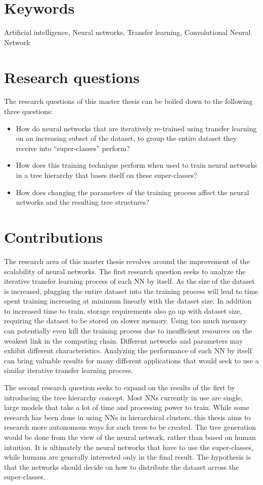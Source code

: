 \section{Keywords}
Artificial intelligence, Neural networks, Transfer learning, Convolutional Neural Network

\section{Research questions}\label{research:questions}
The research questions of this master thesis can be boiled down to the following three questions: 

\begin{itemize}
    \item How do neural networks that are iteratively re-trained using transfer learning on an increasing subset of the dataset, to group the entire dataset they receive into “super-classes” perform? 
    \item How does this training technique perform when used to train neural networks in a tree hierarchy that bases itself on these super-classes?
    \item How does changing the parameters of the training process affect the neural networks and the resulting tree structures?
\end{itemize}{}

\section{Contributions}
The research area of this master thesis revolves around the improvement of the scalability of neural networks. 
The first research question seeks to analyze the iterative transfer learning process of each NN by itself. 
As the size of the dataset is increased, plugging the entire dataset into the training process will lead to time spent training increasing at minimum linearly with the dataset size.
In addition to increased time to train, storage requirements also go up with dataset size, requiring the dataset to be stored on slower memory.
Using too much memory can potentially even kill the training process due to insufficient resources on the weakest link in the computing chain.
Different networks and parameters may exhibit different characteristics. 
Analyzing the performance of each NN by itself can bring valuable results for many different applications that would seek to use a similar iterative transfer learning process. 

The second research question seeks to expand on the results of the first by introducing the tree hierarchy concept. 
Most NNs currently in use are single, large models that take a lot of time and processing power to train. 
While some research has been done in using NNs in hierarchical clusters, this thesis aims to research more autonomous ways for such trees to be created.
The tree generation would be done from the view of the neural network, rather than based on human intuition.
It is ultimately the neural networks that have to use the super-classes, while humans are generally interested only in the final result.
The hypothesis is that the networks should decide on how to distribute the dataset across the super-classes.

